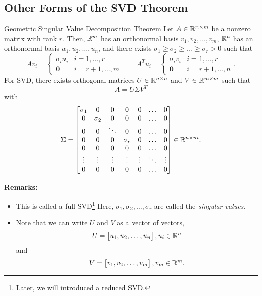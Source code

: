 \documentclass[letterpaper]{article}
\newcommand{\0}{\mathbf{0}}
\begin{document}
\subsection{Other Forms of the SVD Theorem}

\begin{theorem}{Geometric Singular Value Decomposition Theorem}{}
    Let $A \in \mathbb{R}^{n \times m}$ be a nonzero matrix with rank $r$. Then, $\mathbb{R}^m$ has an orthonormal basis $v_1, v_2, \hdots, v_m$, $\mathbb{R}^n$ has an orthonormal basis $u_1, u_2, \hdots, u_n$, and there exists $\sigma_1 \geq \sigma_2 \geq \hdots \geq \sigma_r > 0$ such that 
    \[Av_i = \begin{cases}
        \sigma_i u_i & i = 1, \hdots, r \\ 
        \0 & i = r + 1, \hdots, m
    \end{cases} \qquad A^T u_i = \begin{cases}
        \sigma_i v_i & i = 1, \hdots, r \\ 
        \0 & i = r + 1, \hdots, n
    \end{cases}.\]
    For SVD, there exists orthogonal matrices $U \in \mathbb{R}^{n \times n}$ and $V \in \mathbb{R}^{m \times m}$ such that \[A = U \Sigma V^T\] with \[\Sigma = \begin{bmatrix}
        \sigma_1 & 0 & 0 & 0 & 0 & \hdots & 0 \\ 
        0 & \sigma_2 & 0 & 0 & 0 & \hdots & 0 \\ 
        0 & 0 & \ddots & 0 & 0 & \hdots & 0 \\ 
        0 & 0 & 0 & \sigma_r & 0 & \hdots & 0 \\ 
        0 & 0 & 0 & 0 & 0 & \hdots & 0 \\ 
        \vdots & \vdots & \vdots & \vdots & \vdots & \ddots & \vdots \\ 
        0 & 0 & 0 & 0 & 0 & \hdots & 0
    \end{bmatrix} \in \mathbb{R}^{n \times m}.\]
\end{theorem}
\textbf{Remarks:}
\begin{itemize}
    \item This is called a full SVD\footnote{Later, we will introduced a reduced SVD.} Here, $\sigma_1, \sigma_2, \hdots, \sigma_r$ are called the \emph{singular values}.
    \item Note that we can write $U$ and $V$ as a vector of vectors, 
    \[U = \begin{bmatrix}
        u_1, u_2, \hdots, u_n
    \end{bmatrix}, u_i \in \mathbb{R}^{n}\]
    and \[V = \begin{bmatrix}
        v_1, v_2, \hdots, v_m
    \end{bmatrix}, v_m \in \mathbb{R}^m.\]
\end{itemize}
\end{document}

